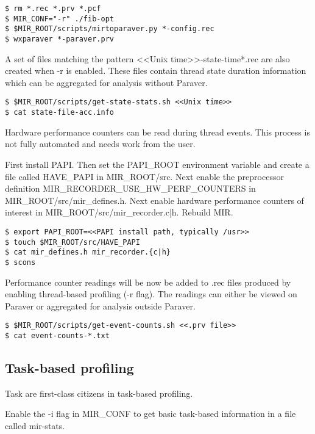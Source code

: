 \documentclass[11pt,a4paper,notitlepage]{article}
\begin{document}
\begin{lstlisting}[style=BashInputStyle]
$ rm *.rec *.prv *.pcf
$ MIR_CONF="-r" ./fib-opt
$ $MIR_ROOT/scripts/mirtoparaver.py *-config.rec 
$ wxparaver *-paraver.prv
\end{lstlisting}

A set of files matching the pattern <<Unix time>>-state-time*.rec are also created when -r is enabled. 
These files contain thread state duration information which can be aggregated for analysis without Paraver.

\begin{lstlisting}[style=BashInputStyle]
$ $MIR_ROOT/scripts/get-state-stats.sh <<Unix time>>
$ cat state-file-acc.info
\end{lstlisting}

Hardware performance counters can be read during thread events. This process is not fully automated and needs work from the user.

First install PAPI. 
Then set the PAPI\_ROOT environment variable and create a file called HAVE\_PAPI in MIR\_ROOT/src.
Next enable the preprocessor definition MIR\_RECORDER\_USE\_HW\_PERF\_COUNTERS in MIR\_ROOT/src/mir\_defines.h.
Next enable hardware performance counters of interest in MIR\_ROOT/src/mir\_recorder.{c|h}.
Rebuild MIR.

\begin{lstlisting}[style=BashInputStyle]
$ export PAPI_ROOT=<<PAPI install path, typically /usr>>
$ touch $MIR_ROOT/src/HAVE_PAPI
$ cat mir_defines.h mir_recorder.{c|h}
$ scons
\end{lstlisting}

Performance counter readings will be now be added to .rec files produced by enabling thread-based profiling (-r flag). 
The readings can either be viewed on Paraver or aggregated for analysis outside Paraver. 

\begin{lstlisting}[style=BashInputStyle]
$ $MIR_ROOT/scripts/get-event-counts.sh <<.prv file>>
$ cat event-counts-*.txt
\end{lstlisting}

\subsection{Task-based profiling}
Task are first-class citizens in task-based profiling.

Enable the -i flag in MIR\_CONF to get basic task-based information in a file called mir-stats.
\end{document}
